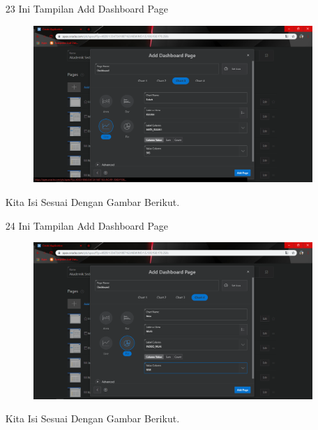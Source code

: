 \begin{enumerate}
\newpage
\item[23]Ini Tampilan Add Dashboard Page

\begin{figure}[!htbp]
    \begin{center}
    \includegraphics[scale=0.3]{figures/34.png}
    \end{center}   
    \end{figure}
    
\par
Kita Isi Sesuai Dengan Gambar Berikut.

\item[24]Ini Tampilan Add Dashboard Page

\begin{figure}[!htbp]
    \begin{center}
    \includegraphics[scale=0.3]{figures/35.png}
    \end{center}   
    \end{figure}
    
\par
Kita Isi Sesuai Dengan Gambar Berikut.


\end{enumerate}
